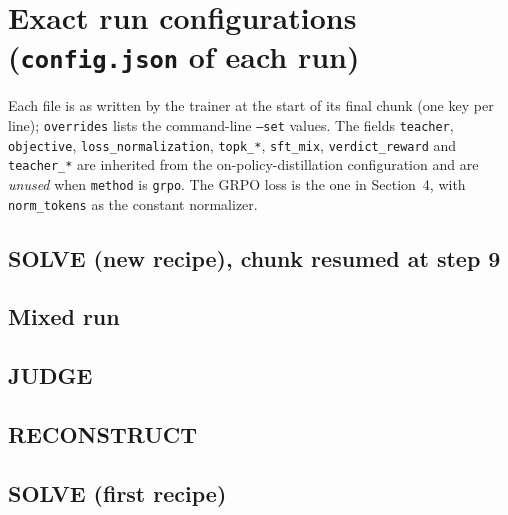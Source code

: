 \documentclass[10pt,a4paper]{article}
\begin{document}
\appendix
\section{Exact run configurations (\texttt{config.json} of each run)}
Each file is as written by the trainer at the start of its final chunk (one key per line); \texttt{overrides}
lists the command-line \texttt{--set} values. The fields \texttt{teacher}, \texttt{objective},
\texttt{loss\_normalization}, \texttt{topk\_*}, \texttt{sft\_mix}, \texttt{verdict\_reward} and
\texttt{teacher\_*} are inherited from the on-policy-distillation configuration and are \emph{unused} when
\texttt{method} is \texttt{grpo}. The GRPO loss is the one in Section~4, with \texttt{norm\_tokens} as the
constant normalizer.

\subsection{SOLVE (new recipe), chunk resumed at step 9}
{\scriptsize}
\subsection{Mixed run}
{\scriptsize}
\subsection{JUDGE}
{\scriptsize}
\subsection{RECONSTRUCT}
{\scriptsize}
\subsection{SOLVE (first recipe)}
{\scriptsize}
\end{document}
